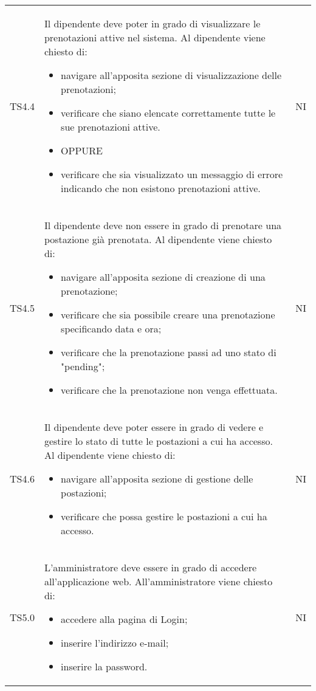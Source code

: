{\begin{longtable}{ c C{11cm} c }
        TS4.4&
        Il dipendente deve poter in grado di visualizzare le prenotazioni attive nel sistema.\newline
        Al dipendente viene chiesto di:
        \begin{itemize}
            \item navigare all'apposita sezione di visualizzazione delle prenotazioni;
            \item verificare che siano elencate correttamente tutte le sue prenotazioni attive.
            \item [] OPPURE
            \item verificare che sia visualizzato un messaggio di errore indicando che non esistono prenotazioni attive.
        \end{itemize}&
        NI\\

        TS4.5&
        Il dipendente deve non essere in grado di prenotare una postazione già prenotata.\newline
        Al dipendente viene chiesto di:
        \begin{itemize}
            \item navigare all'apposita sezione di creazione di una prenotazione;
            \item verificare che sia possibile creare una prenotazione specificando data e ora;
            \item verificare che la prenotazione passi ad uno stato di "pending";
            \item verificare che la prenotazione non venga effettuata.
        \end{itemize}&
        NI\\

        TS4.6&
        Il dipendente deve poter essere in grado di vedere e gestire lo stato di tutte le postazioni a cui ha accesso.\newline
        Al dipendente viene chiesto di:
        \begin{itemize}
            \item navigare all'apposita sezione di gestione delle postazioni;
            \item verificare che possa gestire le postazioni a cui ha accesso.
        \end{itemize}&
        NI\\

        TS5.0&
        L'amministratore deve essere in grado di accedere all'applicazione web.\newline
        All'amministratore viene chiesto di:
        \begin{itemize}
            \item accedere alla pagina di Login;
            \item inserire l'indirizzo e-mail;
            \item inserire la password.
        \end{itemize}&
        NI\\


\end{longtable}}
